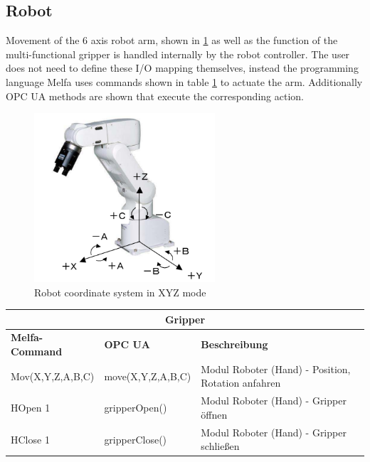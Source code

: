 \documentclass{article}
\begin{document}
\subsection{Robot}
Movement of the 6 axis robot arm, shown in \ref{fig:robot_axis} as well as the function of the multi-functional gripper is handled internally by the robot controller. The user does not need to define these I/O mapping themselves, instead the programming language Melfa uses commands shown in table \ref{tab:robot_ctrl} to actuate the arm. Additionally OPC UA methods are shown that execute the corresponding action.
\begin{figure}[htp]
	\centering
	\includegraphics[width=0.6\textwidth]{images/robot_axis.png}
	\caption{Robot coordinate system in XYZ mode}
	\label{fig:robot_axis}
\end{figure}

\begin{center}
	\setlength\extrarowheight{4pt}
	\small
	\begin{table}[h]
		\begin{tabularx}{\textwidth}{|p{3cm}|p{4cm}|X|}
			\hline
			\multicolumn{3}{|c|}{\bf \color{white} \large Gripper}\\
			\hline\hline
			\bf Melfa-Command & \bf OPC UA & \bf Beschreibung\\
			\hline\hline
			Mov(X,Y,Z,A,B,C) & move(X,Y,Z,A,B,C) & Modul Roboter (Hand) - Position, Rotation anfahren\\
			\hline
			HOpen 1 & gripperOpen() & Modul Roboter (Hand) - Gripper öffnen\\
			\hline
			HClose 1 & gripperClose() & Modul Roboter (Hand) - Gripper schließen\\
			\hline
		\end{tabularx}
		\label{tab:robot_ctrl}
	\end{table}
	
\end{center}
\end{document}
